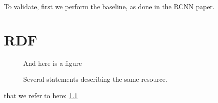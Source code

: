 \documentclass[a4paper,11pt]{kth-mag}
\begin{document}
To validate, first we perform the baseline, as done in the RCNN paper.




\appendix
\addappheadtotoc
\chapter{RDF}\label{appA}

\begin{figure}[ht]
\begin{center}
And here is a figure
\caption{\small{Several statements describing the same resource.}}\label{RDF_4}
\end{center}
\end{figure}

that we refer to here: \ref{RDF_4}
\end{document}
